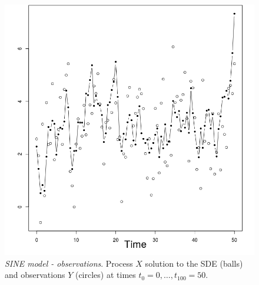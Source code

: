 \documentclass[12pt]{article}
\newcommand{\1}{\mathrm{1}}
\begin{document}
\begin{figure}[p]
\centering
\includegraphics[scale = .5]{obs_SINE}
\caption{{\em SINE model - observations}. Process $X$ solution to the SDE (balls) and observations $Y$ (circles) at times $t_0=0,\dots,t_{100}=50$.}
\label{fig:res:SINE:obs}
\end{figure}
\end{document}
